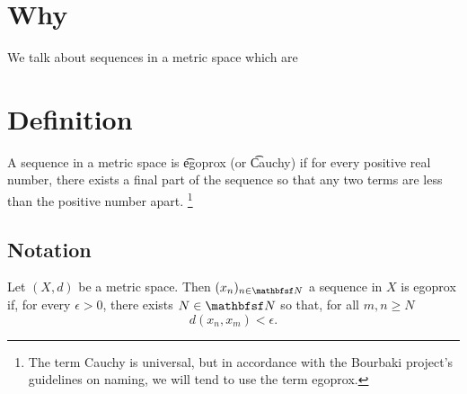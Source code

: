 
\section*{Why}

We talk about sequences in a metric space which are 

\section*{Definition}

A sequence in a metric space is \t{egoprox} (or \t{Cauchy}) if for every positive real number, there exists a final part of the sequence so that any two terms are less than the positive number apart.
  \ifhmode\unskip\fi\footnote{
The term Cauchy is universal, but in accordance with the Bourbaki project's guidelines on naming, we will tend to use the term egoprox.
  }

\subsection*{Notation}

Let $(X, d)$ be a metric space.
Then $(x_n)_{n \in \N }$ a sequence in $X$ is egoprox if, for every $\epsilon  > 0$, there exists $N \in \N $ so that, for all $m, n \geq N$
  \[
d(x_n, x_m) < \epsilon .
  \]

\blankpage